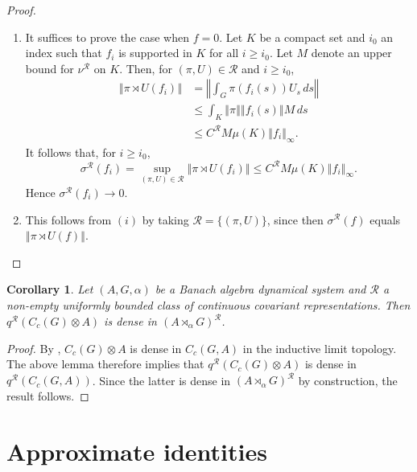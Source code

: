 \documentclass{amsart}
\theoremstyle{plain}
\newtheorem{corol}[theorem]{Corollary}
\theoremstyle{definition}
\numberwithin{equation}{section}
\begin{document}
\begin{proof}
\begin{enumerate}
\item It suffices to prove the case when $f = 0$. Let $K$ be a compact set and $i_0$ an index such that $f_i$ is supported in $K$ for all $i\geq i_0$. Let $M$ denote an upper bound for ${\nu^{\mathcal R}}$ on $K$. Then, for ${(\pi,U)} \in \mathcal{R}$ and $i\geq i_0$,
\begin{align*}
 {\left\Vert {{\pi \rtimes U}(f_i)} \right\Vert} &= {\left\Vert {\int_G \pi(f_i(s))U_s \,ds} \right\Vert} \\
&\leq\int_K {\left\Vert {\pi} \right\Vert}{\left\Vert {f_i(s)} \right\Vert}M\,ds\\
&\leq {{C^{\mathcal R}}} M \mu(K) {\left\Vert {f_i} \right\Vert}_\infty.
\end{align*}
It follows that, for $i\geq i_0$,
\[ {\sigma^{\mathcal R}}(f_i) = \sup_{{(\pi,U)} \in \mathcal{R}} {\left\Vert {{\pi \rtimes U}(f_i)} \right\Vert} \leq {{C^{\mathcal R}}} M \mu(K) {\left\Vert {f_i} \right\Vert}_\infty.\]
Hence ${\sigma^{\mathcal R}}(f_i) \to 0$.
\item This follows from $(i)$ by taking ${\mathcal R} = \{ {(\pi,U)} \}$, since then ${\sigma^{\mathcal R}}(f)$ equals ${\left\Vert {{\pi \rtimes U}(f)} \right\Vert}$.
\end{enumerate}
\end{proof}

\begin{corol}\label{c:image_of_tensor_product_dense_in_crossed_product}
Let ${(A,G,\alpha)}$ be a Banach algebra dynamical system and $\mathcal{R}$ a non-empty uniformly bounded class of continuous covariant representations. Then ${q^{\mathcal R}}(C_c(G) \otimes A)$ is dense in ${(A {\rtimes}_\alpha G)^\mathcal{R}}$.
\end{corol}
\begin{proof}
By \cite[Lemma~1.87]{williams}, $C_c(G) \otimes A$ is dense in $C_c(G,A)$ in the inductive limit topology. The above lemma therefore implies that ${q^{\mathcal R}}(C_c(G)\otimes A)$ is dense in ${q^{\mathcal R}}(C_c(G,A))$. Since the latter is dense in ${(A {\rtimes}_\alpha G)^\mathcal{R}}$ by construction, the result follows.
\end{proof}

\section{Approximate identities}\label{sec:approximate_identities}
\end{document}
